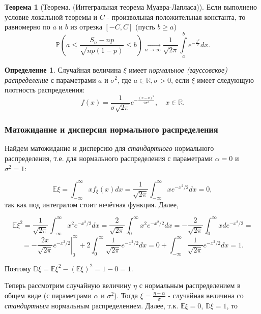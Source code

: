 \documentclass[oneside,final,14pt]{extreport}
\theoremstyle{plain}
\theoremstyle{definition}
\newtheorem*{defn}{Определение}
\theoremstyle{named}
\newtheorem*{namedthm}{Теорема}
\begin{document}
\begin{namedthm}[Теорема. (Интегральная теорема Муавра-Лапласа)]
Если выполнено условие локальной теоремы и $C$ - произвольная положительная константа, то равномерно по $a$ и $b$ из отрезка $[-C,C]$ (пусть $b \geqslant a$)
$$\mathbb{P}\left(a \leqslant \frac{S_{n}-n p}{\sqrt{n p(1-p)}} \leqslant b\right) \underset{n \to \infty}{\longrightarrow} \frac{1}{\sqrt{2 \pi}} \int\limits_{a}^{b} e^{-\frac{x^{2}}{2}} d x.$$
\end{namedthm} 

\begin{defn}
    Случайная величина $\xi$ имеет {\it нормальное (гауссовское) распределение} с параметрами $a$ и $\sigma^2$, где $a \in \mathbb{R}, \sigma > 0$, если $\xi$ имеет следующую плотность распределения: 
$$f(x)=\frac{1}{\sigma \sqrt{2 \pi}} e^{-\frac{(x-a)^{2}}{2 \sigma^{2}}}, \quad x \in \mathbb{R}.$$
\end{defn}

\subsubsection{Матожидание и дисперсия нормального распределения}

Найдем матожидание и дисперсию для {\it стандартного} нормального распределения, т.е. для нормального распределения с параметрами $\alpha = 0$ и $\sigma^2 = 1$:

$$\mathbb{E} \xi=\int_{-\infty}^{\infty} x f_{\xi}(x) d x=\frac{1}{\sqrt{2 \pi}} \int_{-\infty}^{\infty} x e^{-x^{2} / 2} d x=0,$$
так как под интегралом стоит нечётная функция. Далее,

$$\mathbb{E} \xi^{2}=\frac{1}{\sqrt{2 \pi}} \int_{-\infty}^{\infty} x^{2} e^{-x^{2} / 2} d x=\frac{2}{\sqrt{2 \pi}} \int_{0}^{\infty} x^{2} e^{-x^{2} / 2} d x=-\frac{2}{\sqrt{2 \pi}} \int_{0}^{\infty} x d e^{-x^{2} / 2}=$$ $$=-\left.\frac{2 x}{\sqrt{2 \pi}} e^{-x^{2} / 2}\right|_{0} ^{\infty}+2 \int_{0}^{\infty} \frac{1}{\sqrt{2 \pi}} e^{-x^{2} / 2} d x=0+\int_{-\infty}^{\infty} \frac{1}{\sqrt{2 \pi}} e^{-x^{2} / 2} d x=1.$$

Поэтому $\mathbb{D}\xi = \mathbb{E}\xi^2 - (\mathbb{E}\xi)^2 = 1 - 0 = 1.$

Теперь рассмотрим случайную величину $\eta$ с нормальным распределением в общем виде (с параметрами $\alpha$ и $\sigma^2$). Тогда $\xi = \frac{\eta - \alpha}{\sigma}$ - случайная величина со {\it стандартным} нормальным распределением. Далее, т.к. $\mathbb{E}\xi = 0$, $\mathbb{D}\xi = 1$, то 
\end{document}
